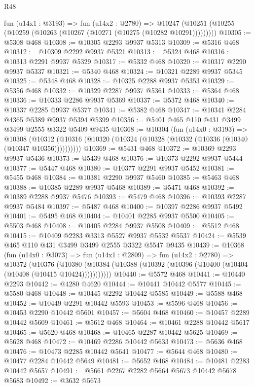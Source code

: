 \begin{lexlean}{R48}
\begin{coremodule}
    fun (u14x1 : @3193) =>
    fun (u14x2 : @2780) =>
    @10247 (@10251 (@10255 (@10259 (@10263 (@10267 (@10271 (@10275 (@10282 @10291)))))))))
@10305 := @5308 @468
@10308 := @10305 @2293 @9937 @5313
@10309 := @5316 @468
@10312 := @10309 @2292 @9937 @5321
@10313 := @5324 @468
@10316 := @10313 @2291 @9937 @5329
@10317 := @5332 @468
@10320 := @10317 @2290 @9937 @5337
@10321 := @5340 @468
@10324 := @10321 @2289 @9937 @5345
@10325 := @5348 @468
@10328 := @10325 @2288 @9937 @5353
@10329 := @5356 @468
@10332 := @10329 @2287 @9937 @5361
@10333 := @5364 @468
@10336 := @10333 @2286 @9937 @5369
@10337 := @5372 @468
@10340 := @10337 @2285 @9937 @5377
@10341 := @5382 @468
@10347 := @10341 @2284 @4365 @5389 @9937 @5394 @5399
@10356 := @5401 @465 @110 @431 @3499 @3499 @2555 @3322 @5409 @9435
@10368 := @10304
    (fun (u14x0 : @3193) =>
    @10308 (@10312 (@10316 (@10320 (@10324 (@10328 (@10332 (@10336 (@10340 (@10347 @10356))))))))))
@10369 := @5431 @468
@10372 := @10369 @2293 @9937 @5436
@10373 := @5439 @468
@10376 := @10373 @2292 @9937 @5444
@10377 := @5447 @468
@10380 := @10377 @2291 @9937 @5452
@10381 := @5455 @468
@10384 := @10381 @2290 @9937 @5460
@10385 := @5463 @468
@10388 := @10385 @2289 @9937 @5468
@10389 := @5471 @468
@10392 := @10389 @2288 @9937 @5476
@10393 := @5479 @468
@10396 := @10393 @2287 @9937 @5484
@10397 := @5487 @468
@10400 := @10397 @2286 @9937 @5492
@10401 := @5495 @468
@10404 := @10401 @2285 @9937 @5500
@10405 := @5503 @468
@10408 := @10405 @2284 @9937 @5508
@10409 := @5512 @468
@10415 := @10409 @2283 @3313 @5527 @9937 @5532 @5537
@10424 := @5539 @465 @110 @431 @3499 @3499 @2555 @3322 @5547 @9435
@10439 := @10368
    (fun (u14x0 : @3073) =>
    fun (u14x1 : @2809) =>
    fun (u14x2 : @2780) =>
    @10372
      (@10376
        (@10380 (@10384 (@10388 (@10392 (@10396 (@10400 (@10404 (@10408 (@10415 @10424)))))))))))
@10440 := @5572 @468
@10441 := @10440 @2293
@10442 := @4280 @4620
@10444 := @10441 @10442 @5577
@10445 := @5580 @468
@10448 := @10445 @2292 @10442 @5585
@10449 := @5588 @468
@10452 := @10449 @2291 @10442 @5593
@10453 := @5596 @468
@10456 := @10453 @2290 @10442 @5601
@10457 := @5604 @468
@10460 := @10457 @2289 @10442 @5609
@10461 := @5612 @468
@10464 := @10461 @2288 @10442 @5617
@10465 := @5620 @468
@10468 := @10465 @2287 @10442 @5625
@10469 := @5628 @468
@10472 := @10469 @2286 @10442 @5633
@10473 := @5636 @468
@10476 := @10473 @2285 @10442 @5641
@10477 := @5644 @468
@10480 := @10477 @2284 @10442 @5649
@10481 := @5652 @468
@10484 := @10481 @2283 @10442 @5657
@10491 := @5661 @2267 @2282 @5664 @5673 @10442 @5678 @5683
@10492 := @3632 @5673

\end{coremodule}
\end{lexlean}
